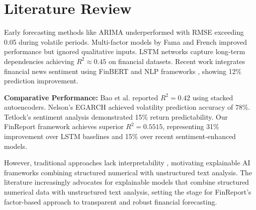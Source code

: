 \documentclass[3p,times,procedia]{elsarticle}
\begin{document}


\section{Literature Review}

Early forecasting methods like ARIMA \cite{Box1970} underperformed with RMSE exceeding 0.05 during volatile periods. Multi-factor models by Fama and French \cite{FAMA1993} improved performance but ignored qualitative inputs. LSTM networks \cite{Fischer2018} capture long-term dependencies achieving $R^2 \approx 0.45$ on financial datasets. Recent work integrates financial news sentiment using FinBERT \cite{Araci2019} and NLP frameworks \cite{Loughran2011}, showing 12\% prediction improvement.

\textbf{Comparative Performance:} Bao et al. \cite{Bao2017} reported $R^2 = 0.42$ using stacked autoencoders. Nelson's EGARCH \cite{Nelson1991} achieved volatility prediction accuracy of 78\%. Tetlock's sentiment analysis \cite{TETLOCK2007} demonstrated 15\% return predictability. Our FinReport framework achieves superior $R^2 = 0.5515$, representing 31\% improvement over LSTM baselines and 15\% over recent sentiment-enhanced models.

However, traditional approaches lack interpretability \cite{Ribeiro2016}, motivating explainable AI frameworks combining structured numerical with unstructured text analysis. The literature increasingly advocates for explainable models that combine structured numerical data with unstructured text analysis, setting the stage for FinReport's factor-based approach to transparent and robust financial forecasting.
\end{document}
